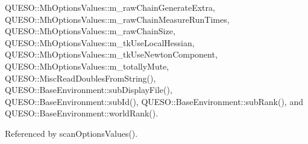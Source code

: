 Q\-U\-E\-S\-O\-::\-Mh\-Options\-Values\-::m\-\_\-raw\-Chain\-Generate\-Extra, Q\-U\-E\-S\-O\-::\-Mh\-Options\-Values\-::m\-\_\-raw\-Chain\-Measure\-Run\-Times, Q\-U\-E\-S\-O\-::\-Mh\-Options\-Values\-::m\-\_\-raw\-Chain\-Size, Q\-U\-E\-S\-O\-::\-Mh\-Options\-Values\-::m\-\_\-tk\-Use\-Local\-Hessian, Q\-U\-E\-S\-O\-::\-Mh\-Options\-Values\-::m\-\_\-tk\-Use\-Newton\-Component, Q\-U\-E\-S\-O\-::\-Mh\-Options\-Values\-::m\-\_\-totally\-Mute, Q\-U\-E\-S\-O\-::\-Misc\-Read\-Doubles\-From\-String(), Q\-U\-E\-S\-O\-::\-Base\-Environment\-::sub\-Display\-File(), Q\-U\-E\-S\-O\-::\-Base\-Environment\-::sub\-Id(), Q\-U\-E\-S\-O\-::\-Base\-Environment\-::sub\-Rank(), and Q\-U\-E\-S\-O\-::\-Base\-Environment\-::world\-Rank().



Referenced by scan\-Options\-Values().


